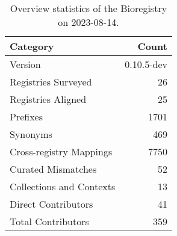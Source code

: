\begin{table}
\caption{Overview statistics of the Bioregistry on 2023-08-14.}
\label{tab:bioregistry-summary}
\begin{tabular}{lr}
\toprule
Category & Count \\
\midrule
Version & 0.10.5-dev \\
Registries Surveyed & 26 \\
Registries Aligned & 25 \\
Prefixes & 1701 \\
Synonyms & 469 \\
Cross-registry Mappings & 7750 \\
Curated Mismatches & 52 \\
Collections and Contexts & 13 \\
Direct Contributors & 41 \\
Total Contributors & 359 \\
\bottomrule
\end{tabular}
\end{table}
